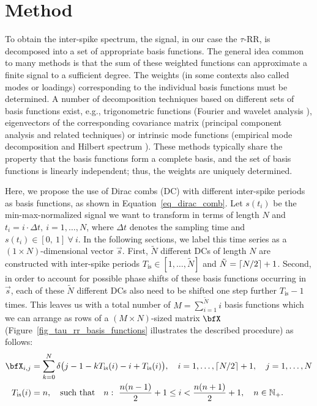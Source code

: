 \documentclass[entropy,article,accept,pdftex,moreauthors]{Definitions/mdpi}
\DeclarePairedDelimiter\ceil{\lceil}{\rceil}
\begin{document}
\section{Method}\label{sec_tau_rr_method}
    

To obtain the inter-spike spectrum, the signal, in our case the $\tau$-RR, is decomposed into a set of appropriate basis functions. 
The general idea common to many methods is that the sum of these weighted functions can approximate a finite signal to a sufficient degree. The weights (in some contexts also called modes or loadings) corresponding to the individual basis functions must be determined.
A number of decomposition techniques based on different sets of basis functions exist, e.g., 
trigonometric functions (Fourier and wavelet analysis \cite{Bracewell1986}), 
eigenvectors of the corresponding covariance matrix (principal component analysis \cite{Hotelling1933} and related techniques) 
or intrinsic mode functions (empirical mode decomposition and Hilbert spectrum \cite{Norden1998}).
These methods typically share the property that the basis functions form a complete basis, and
the set of basis functions is linearly independent; thus, the weights are uniquely determined.

Here, we propose the use of Dirac combs (DC) with 
different inter-spike periods as basis functions, as shown in Equation~\eqref{eq_dirac_comb}. Let $s(t_i)$ be the min-max-normalized signal we want to transform in terms of length $N$ and 
$t_i=i\cdot \Delta t,~i=1,\ldots,N$, where $\Delta t$ denotes the sampling time and $s(t_i) \in [0,\ 1]\ \forall\ i$. In the following sections, we label this time series as a $(1\times N)$-dimensional 
vector $\vec{s}$. 
First, $\tilde{N}$ different DCs of length $N$ are constructed with inter-spike periods $T_\text{is} \in [1,\ldots,\tilde{N}]$ and $\tilde{N}=\ceil*{N/2}+1$. Second, in order to account 
for possible phase shifts of 
these basis functions occurring in $\vec{s}$, each of these $\tilde{N}$ different DCs also need to be shifted one step further $T_\text{is}-1$ times. This leaves us with a total number of 
$M = \sum_{i=1}^{\tilde{N}}i$ 
basis functions which we can arrange as rows of a $(M\times N)$-sized matrix $\bfX$
(Figure~\ref{fig_tau_rr_basis_functions} illustrates the described procedure) as follows:
\begin{align}
\label{eq_basis_matrix} 
\bfX_{i,j} &= \sum_{k=0}^{N}\delta\bigl(j-1-kT_\text{is}(i)-i+T_\text{is}(i) \bigr), \quad i=1,\dots,\ceil*{N/2}+1, \quad j=1,\dots,N\\
\label{eq_T_is} T_\text{is}(i)&= n, \quad \text{such that}\quad n:~ \frac{n(n-1)}{2} + 1 \leq i <  \frac{n(n+1)}{2} + 1,\quad n \in \mathbb{N}_+.
\end{align}
\end{document}
